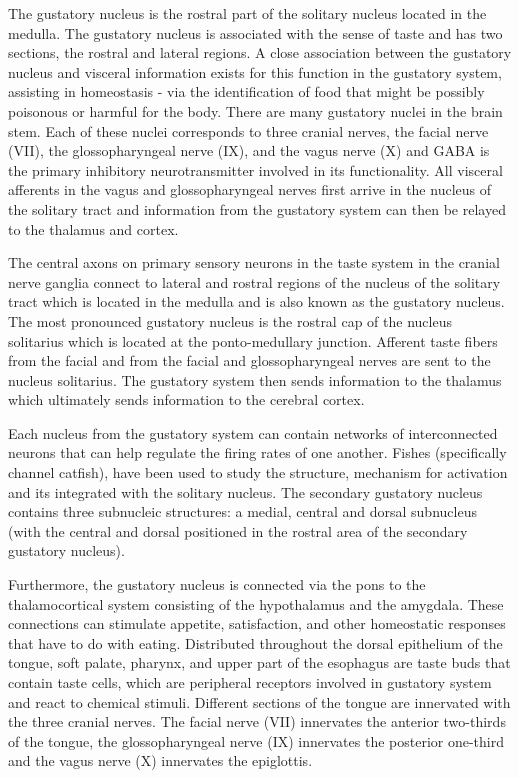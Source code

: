 \documentclass[]{book}
\begin{document}
The gustatory nucleus is the rostral part of the solitary nucleus located in the medulla. The gustatory nucleus is associated with the sense of taste and has two sections, the rostral and lateral regions. A close association between the gustatory nucleus and visceral information exists for this function in the gustatory system, assisting in homeostasis - via the identification of food that might be possibly poisonous or harmful for the body. There are many gustatory nuclei in the brain stem. Each of these nuclei corresponds to three cranial nerves, the facial nerve (VII), the glossopharyngeal nerve (IX), and the vagus nerve (X) and GABA is the primary inhibitory neurotransmitter involved in its functionality. All visceral afferents in the vagus and glossopharyngeal nerves first arrive in the nucleus of the solitary tract and information from the gustatory system can then be relayed to the thalamus and cortex.

The central axons on primary sensory neurons in the taste system in the cranial nerve ganglia connect to lateral and rostral regions of the nucleus of the solitary tract which is located in the medulla and is also known as the gustatory nucleus. The most pronounced gustatory nucleus is the rostral cap of the nucleus solitarius which is located at the ponto-medullary junction. Afferent taste fibers from the facial and from the facial and glossopharyngeal nerves are sent to the nucleus solitarius. The gustatory system then sends information to the thalamus which ultimately sends information to the cerebral cortex.

Each nucleus from the gustatory system can contain networks of interconnected neurons that can help regulate the firing rates of one another. Fishes (specifically channel catfish), have been used to study the structure, mechanism for activation and its integrated with the solitary nucleus. The secondary gustatory nucleus contains three subnucleic structures: a medial, central and dorsal subnucleus (with the central and dorsal positioned in the rostral area of the secondary gustatory nucleus).

Furthermore, the gustatory nucleus is connected via the pons to the thalamocortical system consisting of the hypothalamus and the amygdala. These connections can stimulate appetite, satisfaction, and other homeostatic responses that have to do with eating. Distributed throughout the dorsal epithelium of the tongue, soft palate, pharynx, and upper part of the esophagus are taste buds that contain taste cells, which are peripheral receptors involved in gustatory system and react to chemical stimuli. Different sections of the tongue are innervated with the three cranial nerves. The facial nerve (VII) innervates the anterior two-thirds of the tongue, the glossopharyngeal nerve (IX) innervates the posterior one-third and the vagus nerve (X) innervates the epiglottis.
\end{document}
